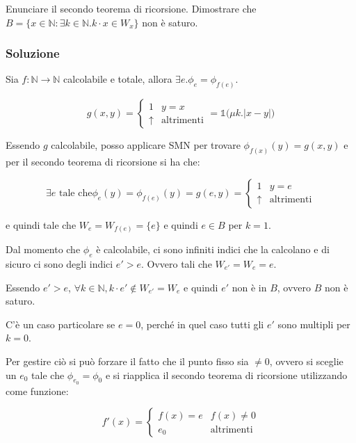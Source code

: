 Enunciare il secondo teorema di ricorsione.
Dimostrare che $B = \{ x \in \mathbb{N} : \exists k \in \mathbb{N} . k \cdot x \in W_x \}$ non è saturo.

\subsubsection{Soluzione}

Sia $f : \mathbb{N} \rightarrow \mathbb{N}$ calcolabile e totale, allora $\exists e . \phi_e = \phi_{f(e)}$.

$$
g(x,y) = \begin{cases}
1 & y = x\\
\uparrow &\text{altrimenti}
\end{cases} = \mathbb{1}\Big( \mu k . |x - y| \Big)
$$

Essendo $g$ calcolabile, posso applicare SMN per trovare $\phi_{f(x)}(y) = g(x,y)$ e per il secondo teorema di ricorsione si ha che:

$$
\exists e \text{ tale che} \phi_e(y) = \phi_{f(e)}(y) = g(e,y) = \begin{cases}
1 & y = e \\
\uparrow &\text{altrimenti}
\end{cases} 
$$

e quindi tale che $W_e = W_{f(e)} = \{e\}$ e quindi $e \in B$ per $k = 1$.

Dal momento che $\phi_e$ è calcolabile, ci sono infiniti indici che la calcolano e di sicuro ci sono degli indici $e' > e$. Ovvero tali che $W_{e'} = W_e = {e}$.

Essendo $e' > e$, $\forall k \in \mathbb{N}, k\cdot e' \notin W_{e'} = W_e$ e quindi $e'$ non è in $B$, ovvero $B$ non è saturo.

C'è un caso particolare se $e = 0$, perché in quel caso tutti gli $e'$ sono multipli per $k = 0$.

Per gestire ciò si può forzare il fatto che il punto fisso sia $\neq 0$, ovvero si sceglie un $e_0$ tale che $\phi_{e_0} = \phi_0$ e si riapplica il secondo teorema di ricorsione utilizzando come funzione:

$$
f'(x) = \begin{cases}
f(x) = e& f(x)\neq 0\\
e_0 &\text{altrimenti} 
\end{cases}
$$

